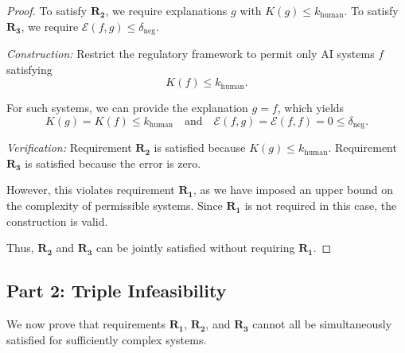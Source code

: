 \documentclass[11pt,letter,leqno]{article}
\begin{document}
\begin{proof}
To satisfy $\mathbf{R_2}$, we require explanations $g$ with $K(g) \leq k_{\text{human}}$. 
To satisfy $\mathbf{R_3}$, we require $\mathcal{E}(f,g) \leq \delta_{\text{neg}}$.

\textit{Construction:} Restrict the regulatory framework to permit only AI systems 
$f$ satisfying
\[
K(f) \leq k_{\text{human}}.
\]

For such systems, we can provide the explanation $g = f$, which yields
\[
K(g) = K(f) \leq k_{\text{human}} \quad \text{and} \quad \mathcal{E}(f,g) = 
\mathcal{E}(f,f) = 0 \leq \delta_{\text{neg}}.
\]

\textit{Verification:} Requirement $\mathbf{R_2}$ is satisfied because 
$K(g) \leq k_{\text{human}}$. Requirement $\mathbf{R_3}$ is satisfied because the 
error is zero.

However, this violates requirement $\mathbf{R_1}$, as we have imposed an upper bound 
on the complexity of permissible systems. Since $\mathbf{R_1}$ is not required in 
this case, the construction is valid.

Thus, $\mathbf{R_2}$ and $\mathbf{R_3}$ can be jointly satisfied without requiring 
$\mathbf{R_1}$.
\end{proof}

\subsection*{Part 2: Triple Infeasibility}

We now prove that requirements $\mathbf{R_1}$, $\mathbf{R_2}$, and $\mathbf{R_3}$ cannot 
all be simultaneously satisfied for sufficiently complex systems.
\end{document}
